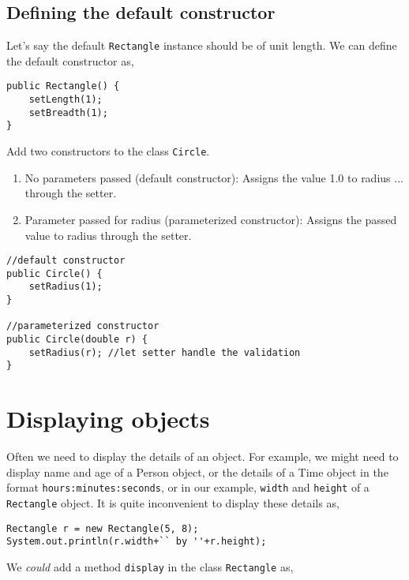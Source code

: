 \documentclass[abstracton]{scrartcl}
\begin{document}
\subsection{Defining the default constructor}

Let's say the default \texttt{Rectangle} instance should be of unit length. We can define the default constructor as,
\begin{lstlisting}
public Rectangle() {
	setLength(1);
	setBreadth(1);
}
\end{lstlisting}

\begin{exercise}
Add two constructors to the class \texttt{Circle}.
\begin{enumerate}
\item No parameters passed (default constructor): Assigns the value 1.0 to radius ... through the setter.
\item Parameter passed for radius (parameterized constructor): Assigns the passed value to radius through the setter.
\end{enumerate}
\end{exercise}
\begin{answer} \begin{lstlisting}
//default constructor
public Circle() {
	setRadius(1);
}

//parameterized constructor
public Circle(double r) {
	setRadius(r); //let setter handle the validation
}
\end{lstlisting} \end{answer}


\section{Displaying objects}

Often we need to display the details of an object. For example, we might need to display name and age of a Person object, or the details of a Time object in the format \texttt{hours:minutes:seconds}, or in our example, \texttt{width} and \texttt{height} of a \texttt{Rectangle} object. It is quite inconvenient to display these details as,

\begin{lstlisting}
Rectangle r = new Rectangle(5, 8);
System.out.println(r.width+`` by ''+r.height);
\end{lstlisting}

We \emph{could} add a method \texttt{display} in the class \texttt{Rectangle} as,
\end{document}
